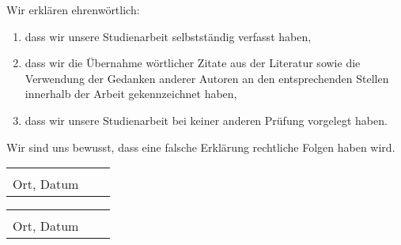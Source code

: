 \documentclass[../main.tex]{subfiles}
\begin{document}
\thispagestyle{empty}

Wir erklären ehrenwörtlich:
\begin{enumerate}
	\item dass wir unsere Studienarbeit selbstständig verfasst haben,
	\item dass wir die Übernahme wörtlicher Zitate aus der Literatur sowie die Verwendung der Gedanken anderer Autoren an den entsprechenden Stellen innerhalb der Arbeit gekennzeichnet haben,
	\item dass wir unsere Studienarbeit bei keiner anderen Prüfung vorgelegt haben.
\end{enumerate}
Wir sind uns bewusst, dass eine falsche Erklärung rechtliche Folgen haben wird.
\vspace{2cm}

\begin{tabular}{lp{2em}l} 
	\hspace{4cm}   && \hspace{4cm} \\\cline{1-1}\cline{3-3} 
	Ort, Datum     && \studentNameOne{}
\end{tabular}

\begin{tabular}{lp{2em}l} 
	\hspace{4cm}   && \hspace{4cm} \\\cline{1-1}\cline{3-3} 
	Ort, Datum     && \studentNameTwo{}
\end{tabular}
\end{document}
